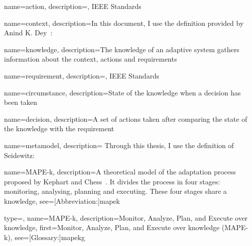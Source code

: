 {
	name={action},
	description={, IEEE Standards~\cite{iso2017systems}}
}

{
	name={context},
	description={In this document, I use the definition provided by Anind K. Dey~\cite{DBLP:journals/puc/Dey01}: }
}

{
	name={knowledge},
	description={The knowledge of an adaptive system gathers information about the \gls{context}, \glspl{action} and \glspl{requirement}}
}

{
	name={requirement},
	description={, IEEE Standards~\cite{iso2017systems}}
}

{
	name={circumstance},
	description={State of the \gls{knowledge} when a \gls{decision} has been taken}
}

{
	name={decision},
	description={A set of \glspl{action} taken after comparing the state of the \gls{knowledge} with the \gls{requirement}}
}

{
	name={metamodel},
	description={
Through this thesis, I use the definition of Seidewitz: ~\cite{DBLP:journals/software/Seidewitz03}
	}
}

{
	name={MAPE-k},
    description={A theoretical model of the adaptation process proposed by Kephart and Chess~\cite{DBLP:journals/computer/KephartC03}. It divides the process in four stages: monitoring, analysing, planning and executing. These four stages share a \gls{knowledge}},
    see=[Abbreviation:]{mapek}
}

{
	type=\acronymtype, 
	name={MAPE-k}, 
	description={Monitor, Analyze, Plan, and Execute over knowledge}, 
	first={Monitor, Analyze, Plan, and Execute over knowledge (MAPE-k)}, 
	see=[Glossary:]{mapekg}
}